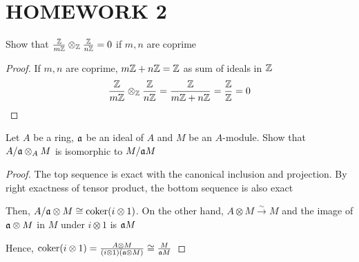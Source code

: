 \chapter{HOMEWORK 2}


\begin{problem}
	Show that $\frac{\mathbb{Z}}{m\mathbb{Z}} \otimes_{\mathbb{Z}} \frac{\mathbb{Z}}{n\mathbb{Z}} = 0$ if $m, n$ are coprime
\end{problem}

\begin{proof}
	If $m, n$ are coprime, $m \mathbb{Z} + n \mathbb{Z} = \mathbb{Z}$ as sum of ideals in $\mathbb{Z}$
	$$
		\frac{\mathbb{Z}}{m\mathbb{Z}} \otimes_{\mathbb{Z}} \frac{\mathbb{Z}}{n\mathbb{Z}} = \frac{\mathbb{Z}}{m \mathbb{Z} + n \mathbb{Z}} = \frac{\mathbb{Z}}{\mathbb{Z}} = 0
	$$
\end{proof}

\begin{problem}
	Let $A$ be a ring, $\mathfrak{a}$ be an ideal of $A$ and $M$ be an $A$-module. Show that $A / \mathfrak{a} \otimes_A M$ is isomorphic to $M / \mathfrak{a} M$
\end{problem}

\begin{proof}
	The top sequence is exact with the canonical inclusion and projection. By right exactness of tensor product, the bottom sequence is also exact
	
	\begin{center}
	\end{center}
	
	Then, $A / \mathfrak{a} \otimes M \cong \operatorname{coker} (i \otimes 1)$. On the other hand, $A \otimes M \xrightarrow{\sim}  M$ and the image of $\mathfrak{a} \otimes M$ in $M$ under $i \otimes 1$ is $\mathfrak{a}M$
	\begin{center}
	\end{center}
	
	Hence, $\operatorname{coker} (i \otimes 1) = \frac{A \otimes M}{(i \otimes 1)(\mathfrak{a} \otimes M)} \cong \frac{M}{\mathfrak{a} M}$
\end{proof}



